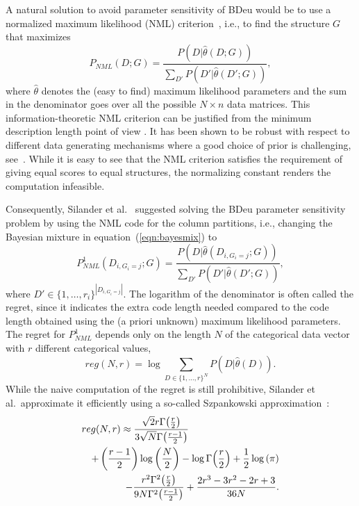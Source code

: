 A natural solution to avoid parameter sensitivity of BDeu would be to
use a normalized maximum likelihood (NML)
criterion~\cite{Shta87,Riss96a}, i.e., to find the structure $G$ that
maximizes
\begin{equation}
P_{NML}(D;G)=\frac{P(D|\hat\theta(D;G))}{\sum_{D'}{P(D'|\hat\theta(D';G))}},
\end{equation}
where $\hat\theta$ denotes the (easy to find) maximum likelihood
parameters and the sum in the denominator goes over all the possible
$N\times n$ data matrices. This information-theoretic NML criterion
can be justified from the minimum description length point of view
\cite{Riss78,Grun07}. It has been shown to be robust with respect to
different data generating mechanisms where a good choice of prior
is challenging, see~\cite{eggeling2014robust,maatta16}. While it is
easy to see that the NML criterion satisfies the requirement of giving
equal scores to equal structures, the normalizing constant renders the
computation infeasible.

Consequently, Silander et al.~\cite{cosco.pgm08a}
suggested solving the BDeu parameter sensitivity problem by using the
NML code for the column partitions, i.e., changing the Bayesian mixture
in equation~(\ref{eqn:bayesmix}) to
\begin{equation}
P^1_{NML}(D_{i,G_i=j};G)=\frac{P(D|\hat\theta(D_{i,G_i=j};G))}{\sum_{D'}{P(D'|\hat\theta(D';G))}},
\end{equation}
where $D'\in{\{1,\ldots,r_i\}}^{|D_{i,G_i=j}|}$.  The logarithm of the
denominator is often called the regret, since it indicates the extra
code length needed compared to the code length obtained using the (a
priori unknown) maximum likelihood parameters. The regret for
$P^1_{NML}$ depends only on the length $N$ of the categorical data
vector with $r$ different categorical values,
\begin{equation}
reg(N,r)=\log \sum_{D\in \{1,\ldots,r\}^N} P(D|\hat\theta(D)).
\end{equation}
While the naive
computation of the regret is still prohibitive, Silander et al.\
approximate it efficiently using a so-called Szpankowski
approximation~\cite{cosco.aistat03}:
\begin{eqnarray}
\label{eqn:szp1}
\lefteqn{reg(N,r) \approx \frac{\sqrt{2} r \Gamma{\left(\frac{r}{2} \right)}}
                               {3 \sqrt{N} \Gamma{\left(\frac{r-1}{2}  \right)}}} \\
&&+ \left(\frac{r-1}{2}\right) \log{\left (\frac{N}{2} \right )}
- \log \Gamma{\left(\frac{r}{2} \right)} + \frac{1}{2} \log{\left (\pi \right )}\nonumber\\
&&- \frac{r^{2} \Gamma^{2}{\left(\frac{r }{2} \right)}}
         {9N \Gamma^{2}{\left(\frac{r-1}{2}\right)}}
+ \frac{2r^3-3r^2-2r+3}{36N}\nonumber.
\end{eqnarray}

